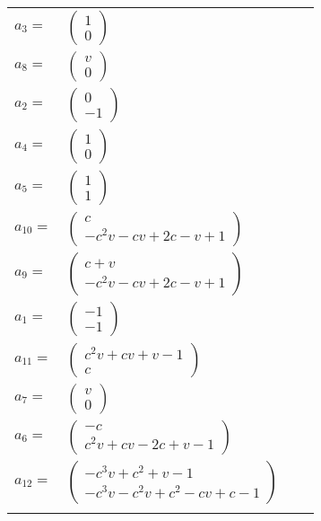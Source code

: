 \documentclass[1p]{elsarticle_modified}
\theoremstyle{definition}
\begin{document}
\begin{tabular}{m{7pt} m{180pt} m{7pt} m{180pt} }
\flushright $a_{3}=$&$\begin{pmatrix}1\\0\end{pmatrix}$ \\
\flushright $a_{8}=$&$\begin{pmatrix}v\\0\end{pmatrix}$ \\
\flushright $a_{2}=$&$\begin{pmatrix}0\\-1\end{pmatrix}$ \\
\flushright $a_{4}=$&$\begin{pmatrix}1\\0\end{pmatrix}$ \\
\flushright $a_{5}=$&$\begin{pmatrix}1\\1\end{pmatrix}$ \\
\flushright $a_{10}=$&$\begin{pmatrix}c\\- c^2 v- c v+2 c- v+1\end{pmatrix}$ \\
\flushright $a_{9}=$&$\begin{pmatrix}c+v\\- c^2 v- c v+2 c- v+1\end{pmatrix}$ \\
\flushright $a_{1}=$&$\begin{pmatrix}-1\\-1\end{pmatrix}$ \\
\flushright $a_{11}=$&$\begin{pmatrix}c^2 v+c v+v-1\\c\end{pmatrix}$ \\
\flushright $a_{7}=$&$\begin{pmatrix}v\\0\end{pmatrix}$ \\
\flushright $a_{6}=$&$\begin{pmatrix}- c\\c^2 v+c v-2 c+v-1\end{pmatrix}$ \\
\flushright $a_{12}=$&$\begin{pmatrix}- c^3 v+c^2+v-1\\- c^3 v- c^2 v+c^2- c v+c-1\end{pmatrix}$\\&\end{tabular}
\end{document}
